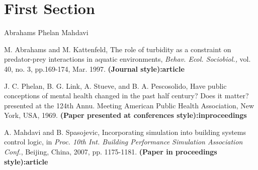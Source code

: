 \documentclass{article}
\begin{document}
\section{First Section}
Abrahams \cite{abrahams1997role} Phelan \cite{phelan1996have} Mahdavi \cite{mahdavi2007incorporating}




\begin{thebibliography}{99}
\normalsize\addtolength{\itemsep}{-1em}
\vspace {1.5mm}

M. Abrahams and M. Kattenfeld, The role of turbidity as a constraint on predator-prey interactions in aquatic environments, \emph{Behav. Ecol. Sociobiol.,} vol. 40, no. 3, pp.169-174, Mar. 1997. \textbf{(Journal style):article}

J. C. Phelan, B. G. Link, A. Stueve, and B. A. Pescosolido, Have public conceptions of mental health changed in the past half century? Does it matter? presented at the 124th Annu. Meeting American Public Health Association, New York, USA, 1969. \textbf{(Paper presented at conferences style):inproceedings}

A. Mahdavi and B. Spasojevic, Incorporating simulation into building systems control logic, in \emph{Proc. 10th Int. Building Performance Simulation Association Conf.}, Beijing, China, 2007, pp. 1175-1181. \textbf{(Paper in proceedings style):article}


\end{thebibliography}
\end{document}
